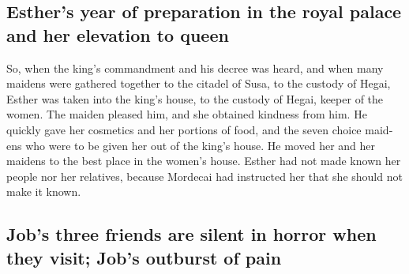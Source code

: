 \begin{paracol}{2}
\begin{otherlanguage}{english}
\hypertarget{esthers-year-of-preparation-in-the-royal-palace-and-her-elevation-to-queen}{%
\subsection{Esther's year of preparation in the royal palace and her
elevation to
queen}\label{esthers-year-of-preparation-in-the-royal-palace-and-her-elevation-to-queen}}

 So, when the king's commandment and his decree was heard,
and when many maidens were gathered together to the citadel of Susa, to
the custody of Hegai, Esther was taken into the king's house, to the
custody of Hegai, keeper of the women.  The maiden pleased
him, and she obtained kindness from him. He quickly gave her cosmetics
and her portions of food, and the seven choice maidens who were to be
given her out of the king's house. He moved her and her maidens to the
best place in the women's house.  Esther had not made
known her people nor her relatives, because Mordecai had instructed her
that she should not make it known.

\hypertarget{jobs-three-friends-are-silent-in-horror-when-they-visit-jobs-outburst-of-pain}{%
\subsection{Job's three friends are silent in horror when they visit;
Job's outburst of
pain}\label{jobs-three-friends-are-silent-in-horror-when-they-visit-jobs-outburst-of-pain}}


\end{otherlanguage}
\end{paracol}
